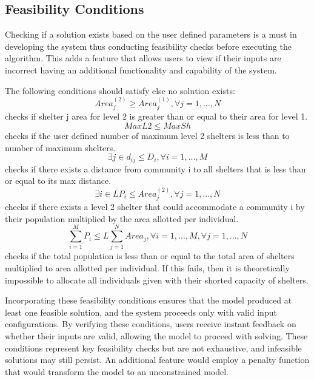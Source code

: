 	
	
\subsection{Feasibility Conditions}

	Checking if a solution exists based on the user defined parameters is a must in developing the system thus conducting feasibility checks before executing the algorithm. This adds a feature that allows users to view if their inputs are incorrect having an additional functionality and capability of the system.
	
	The following conditions should satisfy else no solution exists:
	\begin{equation*} 
		\label{f1}
		Area_{j}^{(2)} \ge Area_{j}^{(1)}, \forall j = 1, ..., N
	\end{equation*}
	checks if shelter j area for level 2 is greater than or equal to their area for level 1. 
	\begin{equation*} 
		\label{f2}
		MaxL2 \le MaxSh
	\end{equation*}
	checks if the user defined number of maximum level 2 shelters is less than to number of maximum shelters.
	\begin{equation*} 
		\label{f3}
		\exists j \in d_{ij} \le D_{i}, \forall i = 1, ..., M
	\end{equation*}
	checks if there exists a distance from community i to all shelters that is less than or equal to its max distance.
	\begin{equation*} 
		\label{f4}
		\exists i \in LP_{i} \le Area_{j}^{(2)}, \forall j = 1, ..., N
	\end{equation*}
	checks if there exists a level 2 shelter that could accommodate a community i by their population multiplied by the area allotted per individual. 
	\begin{equation*} 
		\label{f5}
		\sum_{i=1}^{M}P_{i} \le L\sum_{j=1}^{N}Area_{j}, \forall i=1,...,M,  \forall j=1,...,N
	\end{equation*}
	checks if the total population is less than or equal to the total area of shelters multiplied to area allotted per individual. If this fails, then it is theoretically impossible to allocate all individuals given with their shorted capacity of shelters.
	
	Incorporating these feasibility conditions ensures that the model produced at least one feasible solution, and the system proceeds only with valid input configurations. By verifying these conditions, users receive instant feedback on whether their inputs are valid, allowing the model to proceed with solving. These conditions represent key feasibility checks but are not exhaustive, and infeasible solutions may still persist. An additional feature would employ a penalty function that would transform the model to an unconstrained model.	
	
